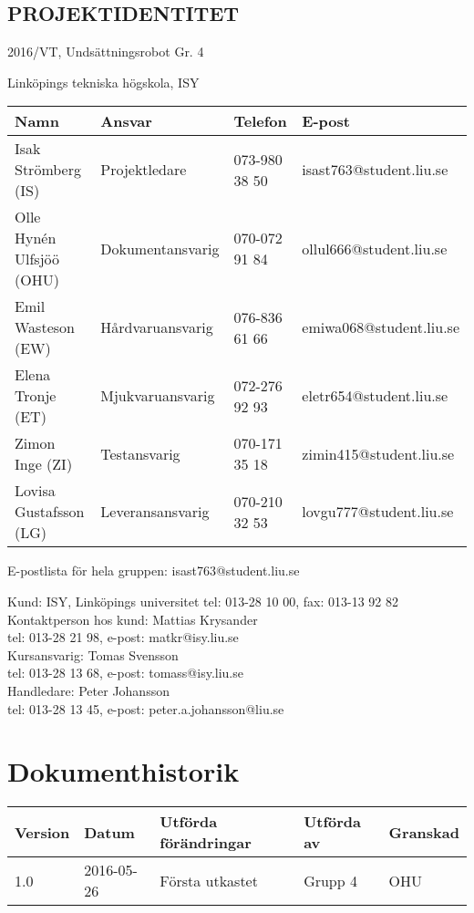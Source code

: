 \documentclass[11pt]{article}
\begin{document}
\pagebreak
\begin{center}

\section*{PROJEKTIDENTITET}
2016/VT, Undsättningsrobot Gr. 4

Linköpings tekniska högskola, ISY
\vspace{5em}

\begin{tabular}{|l|l|l|l|} \hline
\textbf{Namn} & \textbf{Ansvar} & \textbf{Telefon} & \textbf{E-post}  \\ \hline 
Isak Strömberg (IS) & Projektledare & 073-980 38 50 & isast763@student.liu.se \\ \hline
Olle Hynén Ulfsjöö (OHU)& Dokumentansvarig & 070-072 91 84 & ollul666@student.liu.se \\ \hline
Emil Wasteson (EW) & Hårdvaruansvarig & 076-836 61 66 & emiwa068@student.liu.se \\ \hline
Elena Tronje (ET) & Mjukvaruansvarig & 072-276 92 93 & eletr654@student.liu.se \\ \hline
Zimon Inge (ZI) & Testansvarig & 070-171 35 18 & zimin415@student.liu.se \\ \hline
Lovisa Gustafsson (LG) & Leveransansvarig & 070-210 32 53 & lovgu777@student.liu.se \\ \hline
\end{tabular}


E-postlista för hela gruppen: isast763@student.liu.se

\vspace{5em}
Kund: ISY, Linköpings universitet 
tel: 013-28 10 00, fax: 013-13 92 82 \\
Kontaktperson hos kund: Mattias Krysander \\
tel: 013-28 21 98, e-post: matkr@isy.liu.se \\

\vspace{5em}
Kursansvarig:  Tomas Svensson\\
tel: 013-28 13 68, e-post: tomass@isy.liu.se \\
Handledare: Peter Johansson \\
tel: 013-28 13 45, e-post: peter.a.johansson@liu.se
\end{center}
\pagebreak

\tableofcontents

\pagebreak

\section*{Dokumenthistorik}
\begin{table}[h]
\begin{tabular}{|l|l|l|l|l|} \hline

\textbf{Version} & \textbf{Datum} & \textbf{Utförda förändringar} & \textbf{Utförda av} & \textbf{Granskad} \\ \hline
1.0 & 2016-05-26 & Första utkastet & Grupp 4 & OHU \\ \hline
\end{tabular}
\end{table}
\end{document}
